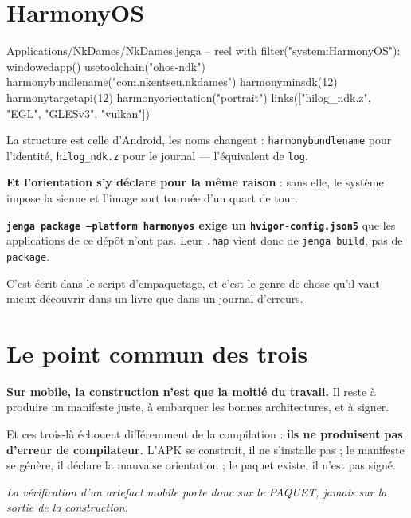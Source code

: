 \section{HarmonyOS}

\begin{nkcode}{Applications/NkDames/NkDames.jenga -- reel}
with filter("system:HarmonyOS"):
    windowedapp()
    usetoolchain("ohos-ndk")
    harmonybundlename("com.nkentseu.nkdames")
    harmonyminsdk(12)
    harmonytargetapi(12)
    harmonyorientation("portrait")
    links(["hilog_ndk.z", "EGL", "GLESv3", "vulkan"])
\end{nkcode}

\begin{nkretenir}
La structure est celle d'Android, les noms changent :
\texttt{harmonybundlename} pour l'identité, \texttt{hilog\_ndk.z} pour le
journal --- l'équivalent de \texttt{log}.

\textbf{Et l'orientation s'y déclare pour la même raison} : sans elle, le
système impose la sienne et l'image sort tournée d'un quart de tour.
\end{nkretenir}

\begin{nkpiege}
\textbf{\texttt{jenga package --platform harmonyos} exige un
\texttt{hvigor-config.json5}} que les applications de ce dépôt n'ont pas. Leur
\texttt{.hap} vient donc de \texttt{jenga build}, pas de \texttt{package}.

C'est écrit dans le script d'empaquetage, et c'est le genre de chose qu'il vaut
mieux découvrir dans un livre que dans un journal d'erreurs.
\end{nkpiege}

\section{Le point commun des trois}

\begin{nkretenir}
\textbf{Sur mobile, la construction n'est que la moitié du travail.} Il reste à
produire un manifeste juste, à embarquer les bonnes architectures, et à signer.

Et ces trois-là échouent différemment de la compilation : \textbf{ils ne
produisent pas d'erreur de compilateur.} L'APK se construit, il ne s'installe
pas ; le manifeste se génère, il déclare la mauvaise orientation ; le paquet
existe, il n'est pas signé.

\emph{La vérification d'un artefact mobile porte donc sur le PAQUET, jamais sur
la sortie de la construction.}
\end{nkretenir}


